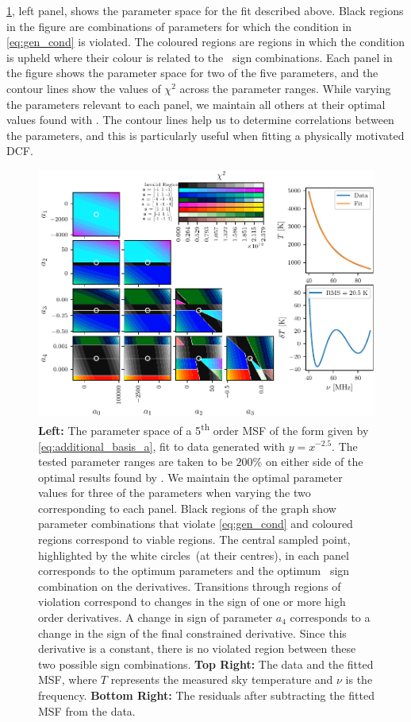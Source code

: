 \cref{fig:poly_params}, left panel, shows the parameter space for the fit described above. Black regions in the figure are combinations of parameters for which the condition in \cref{eq:gen_cond} is violated. The coloured regions are regions in which the condition is upheld where their colour is related to the \maxsmooth~sign combinations. Each panel in the figure shows the parameter space for two of the five parameters, and the contour lines show the values of $\chi^2$ across the parameter ranges. While varying the parameters relevant to each panel, we maintain all others at their optimal values found with \maxsmooth. The contour lines help us to determine correlations between the parameters, and this is particularly useful when fitting a physically motivated DCF.

\begin{figure}
    \centering
    \includegraphics{maxsmooth/figs/Figure2.pdf}
    \caption{\textbf{Left:} The parameter space of a 5\textsuperscript{th} order MSF of the form given by \cref{eq:additional_basis_a}, fit to data generated with $y = x^{-2.5}$. The tested parameter ranges are taken to be $200\%$ on either side of the optimal results found by \maxsmooth. We maintain the optimal parameter values for three of the parameters when varying the two corresponding to each panel. Black regions of the graph show parameter combinations that violate \cref{eq:gen_cond} and coloured regions correspond to viable regions. The central sampled point, highlighted by the white circles~(at their centres), in each panel corresponds to the optimum parameters and the optimum \maxsmooth~sign combination on the derivatives. Transitions through regions of violation correspond to changes in the sign of one or more high order derivatives. A change in sign of parameter $a_4$ corresponds to a change in the sign of the final constrained derivative. Since this derivative is a constant, there is no violated region between these two possible sign combinations. \textbf{Top Right:} The data and the fitted MSF, where $T$ represents the measured sky temperature and $\nu$ is the frequency. \textbf{Bottom Right:} The residuals after subtracting the fitted MSF from the data.}
    \label{fig:poly_params}
\end{figure}

